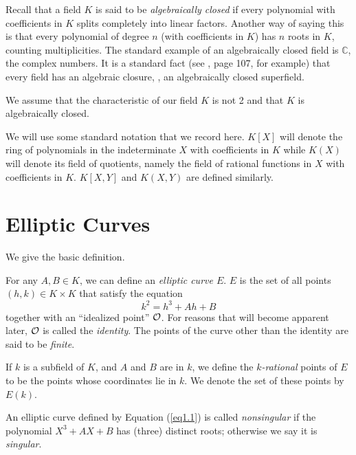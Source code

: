 Recall that a field $K$ is said to be {\it algebraically closed} if every polynomial with coefficients in $K$ splits completely into linear factors. Another way of saying this is that every polynomial of degree $n$ (with coefficients in $K$) has $n$ roots in $K$, counting multiplicities. The standard example of an algebraically closed field is $\mathbb{C}$, the complex numbers. It is a standard fact (see \cite{r1.2}, page 107, for example) that every field has an algebraic closure, \ie, an algebraically closed superfield.

We assume that the characteristic of our field $K$ is not 2 and that $K$ is algebraically closed.

We will use some standard notation that we record here. $K[X]$ will denote the ring of polynomials in the indeterminate $X$ with coefficients in $K$ while $K(X)$ will denote its field of quotients, namely the field of rational functions in $X$ with coefficients in $K$. $K[X, Y]$ and $K(X, Y)$ are defined similarly.

\section{Elliptic Curves}

We give the basic definition.

\begin{defi}
\label{d2.1}
For any $A,B\in K$, we can define an {\it elliptic curve $E$}. $E$ is the set of all points $(h,k)\in K \times K$ that satisfy the equation
\begin{equation}
\label{eq1.1}
k^{2}=h^{3}+Ah+B
\end{equation}
together with an ``idealized point'' $\mathcal{O}$. For reasons that will become apparent later, $\mathcal{O}$ is called the {\it identity}. The points of the curve other than the identity are said to be {\it finite}.
\end{defi}

\begin{defi}
\label{d2.2}
If $k$ is a subfield of $K$, and $A$ and $B$ are in $k$, we define the {\it $k$-rational} points of $E$ to be the points whose coordinates lie in $k$. We denote the set of these points by $E(k)$.
\end{defi}

\begin{defi}
\label{d2.3}
An elliptic curve defined by Equation (\ref{eq1.1}) is called {\it nonsingular} if the polynomial $X^{3}+AX+B$ has (three) distinct roots; otherwise we say it is {\it singular}.
\end{defi}

